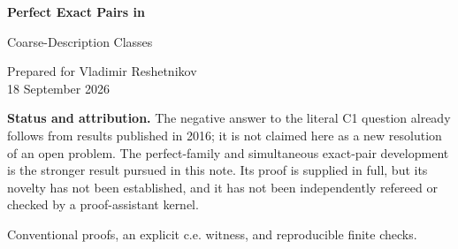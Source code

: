 \documentclass[11pt,a4paper]{article}
\newcommand{\CD}{\mathcal C}
\newcommand{\core}{\mathcal I}
\newcommand{\Comp}{\mathsf{Comp}}
\theoremstyle{definition}\newtheorem{definition}[theorem]{Definition}
\theoremstyle{remark}\newtheorem{remark}[theorem]{Remark}
\begin{document}
\thispagestyle{empty}
\par
\vspace{7mm}
{\setlength{\parindent}{0pt}\fontsize{25}{29}\selectfont\bfseries\color{navy}Perfect Exact Pairs in\par Coarse-Description Classes\par}
\vspace{4mm}
\par
\vspace{5mm}
\noindent Prepared for Vladimir Reshetnikov\\[2pt]
18 September 2026\par
\vspace{5mm}
\begin{abstract}
We investigate the least-representative question selected as C1 in the supplied
Turing-degree survey. For a set $X$, let $\CD_X$ be the sets differing from $X$
on a density-zero set, and let $\core_X$ be the sets computable from every
member of $\CD_X$. We give a conventional proof that $\CD_X$ contains a perfect
family of pairwise Turing-incomparable members such that the common lower cone
of any two is exactly $\core_X$. The construction can simultaneously control
intersections with the lower cones of any prescribed countable family of
oracles. Its main ingredient is a local recovery lemma in a complete metric
on $\CD_X$: information computed on a dense open-region subset is already
computable from every coarse description.

An explicit computably enumerable, many-one complete set $X$ has
$\core_X=\Comp$ but no computable coarse description. Consequently its uniform
and nonuniform coarse-equivalence classes contain Turing minimal pairs, have
no least Turing degree, and have no countable coinitial family of Turing
degrees. Relativized examples have any prescribed principal core. All infinite
arguments are written out; the accompanying program checks only finite
arithmetic lemmas.
\end{abstract}
\vspace{3mm}
\noindent\colorbox{pale}{\parbox{\dimexpr\linewidth-2\fboxsep\relax}{\small
\textbf{Status and attribution.} The negative answer to the literal C1 question
already follows from results published in 2016; it is not claimed here as a
new resolution of an open problem. The perfect-family and simultaneous
exact-pair development is the stronger result pursued in this note. Its proof
is supplied in full, but its novelty has not been established, and it has not
been independently refereed or checked by a proof-assistant kernel.}}
\vfill
{\noindent\small Conventional proofs, an explicit c.e. witness, and reproducible finite checks.\par}
\normalsize
\newpage
{\small\tableofcontents}
\newpage
\end{document}
